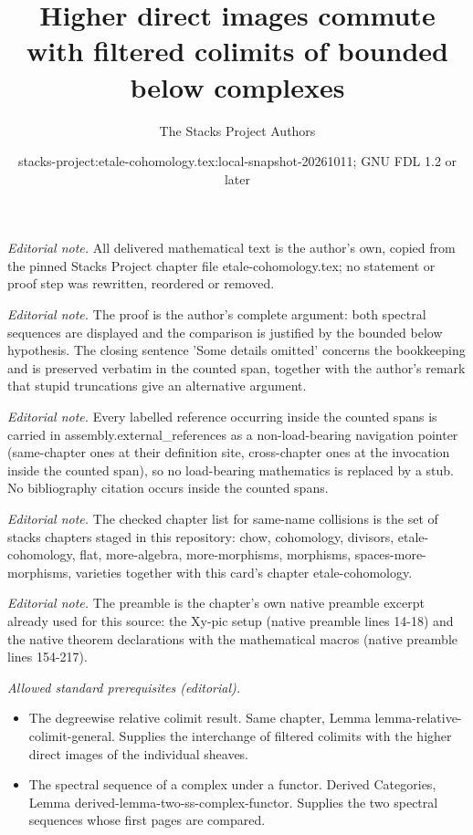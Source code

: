\documentclass[10pt,a4paper]{amsart}
\title{Higher direct images commute with filtered colimits of bounded below complexes}
\author{The Stacks Project Authors}
\date{stacks-project:etale-cohomology.tex:local-snapshot-20261011; GNU FDL 1.2 or later}
\theoremstyle{plain}
\theoremstyle{definition}
\theoremstyle{remark}
\numberwithin{equation}{subsection}
\begin{document}
\maketitle
\noindent\textit{Editorial note.} All delivered mathematical text is the author's own, copied from the pinned Stacks Project chapter file etale-cohomology.tex; no statement or proof step was rewritten, reordered or removed.\par\medskip
\noindent\textit{Editorial note.} The proof is the author's complete argument: both spectral sequences are displayed and the comparison is justified by the bounded below hypothesis. The closing sentence 'Some details omitted' concerns the bookkeeping and is preserved verbatim in the counted span, together with the author's remark that stupid truncations give an alternative argument.\par\medskip
\noindent\textit{Editorial note.} Every labelled reference occurring inside the counted spans is carried in assembly.external\_references as a non-load-bearing navigation pointer (same-chapter ones at their definition site, cross-chapter ones at the invocation inside the counted span), so no load-bearing mathematics is replaced by a stub. No bibliography citation occurs inside the counted spans.\par\medskip
\noindent\textit{Editorial note.} The checked chapter list for same-name collisions is the set of stacks chapters staged in this repository: chow, cohomology, divisors, etale-cohomology, flat, more-algebra, more-morphisms, morphisms, spaces-more-morphisms, varieties together with this card's chapter etale-cohomology.\par\medskip
\noindent\textit{Editorial note.} The preamble is the chapter's own native preamble excerpt already used for this source: the Xy-pic setup (native preamble lines 14-18) and the native theorem declarations with the mathematical macros (native preamble lines 154-217).\par\medskip
\noindent\textit{Allowed standard prerequisites (editorial).}\begin{itemize}
\item The degreewise relative colimit result. Same chapter, Lemma lemma-relative-colimit-general. Supplies the interchange of filtered colimits with the higher direct images of the individual sheaves.
\item The spectral sequence of a complex under a functor. Derived Categories, Lemma derived-lemma-two-ss-complex-functor. Supplies the two spectral sequences whose first pages are compared.
\end{itemize}\medskip
\end{document}
